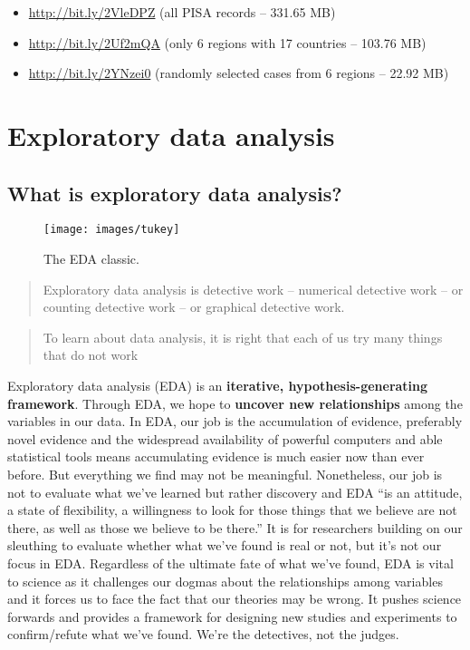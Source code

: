 \documentclass[
]{book}
\providecommand{\tightlist}{%
  \setlength{\itemsep}{0pt}\setlength{\parskip}{0pt}}
\begin{document}
\begin{itemize}
\tightlist
\item
  \url{http://bit.ly/2VleDPZ} (all PISA records -- 331.65 MB)
\item
  \url{http://bit.ly/2Uf2mQA} (only 6 regions with 17 countries -- 103.76 MB)
\item
  \url{http://bit.ly/2YNzei0} (randomly selected cases from 6 regions -- 22.92 MB)
\end{itemize}

\hypertarget{eda}{%
\chapter{Exploratory data analysis}\label{eda}}

\hypertarget{what-is-exploratory-data-analysis}{%
\section{What is exploratory data analysis?}\label{what-is-exploratory-data-analysis}}

\begin{figure}
\texttt{[image: images/tukey]} \caption{The EDA classic.}\label{fig:tukey}
\end{figure}

\begin{quote}
Exploratory data analysis is detective work -- numerical detective work -- or counting detective work -- or graphical detective work.
\end{quote}

\begin{quote}
To learn about data analysis, it is right that each of us try many things that do not work
\end{quote}

Exploratory data analysis (EDA) is an \textbf{iterative, hypothesis-generating framework}. Through EDA, we hope to \textbf{uncover new relationships} among the variables in our data. In EDA, our job is the accumulation of evidence, preferably novel evidence and the widespread availability of powerful computers and able statistical tools means accumulating evidence is much easier now than ever before. But everything we find may not be meaningful. Nonetheless, our job is not to evaluate what we've learned but rather discovery and EDA ``is an attitude, a state of flexibility, a willingness to look for those things that we believe are not there, as well as those we believe to be there.'' It is for researchers building on our sleuthing to evaluate whether what we've found is real or not, but it's not our focus in EDA. Regardless of the ultimate fate of what we've found, EDA is vital to science as it challenges our dogmas about the relationships among variables and it forces us to face the fact that our theories may be wrong. It pushes science forwards and provides a framework for designing new studies and experiments to confirm/refute what we've found. We're the detectives, not the judges.
\end{document}
